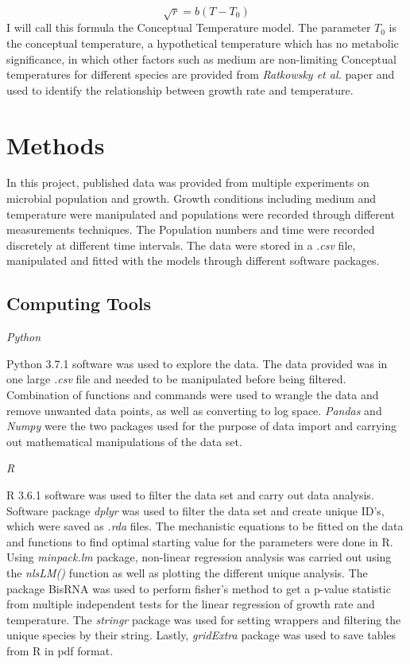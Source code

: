 \documentclass[11pt]{article}
\begin{document}
\begin{equation*}
    \sqrt{r}=b(T-T_0) \label{eq:Conceptual Temperature model} \tag{3}
\end{equation*}
I will call this formula the Conceptual Temperature model. The parameter $T_0$ is the conceptual temperature, a hypothetical temperature which has no metabolic significance, in which other factors such as medium are non-limiting \cite{ratkowsky1982relationship} Conceptual temperatures for different species are provided from \textit{Ratkowsky et al.} paper and used to identify the relationship between growth rate and temperature.

\section{Methods}
In this project, published data was provided from multiple experiments on microbial population and growth. Growth conditions including medium and temperature were manipulated and populations were recorded through different measurements techniques. The Population numbers and time were recorded discretely at different time intervals. The data were stored in a \textit{.csv} file, manipulated and fitted with the models through different software packages.\\

\subsection{Computing Tools}
\textit{Python}

Python 3.7.1 software was used to explore the data. The data provided was in one large \textit{.csv} file and needed to be manipulated before being filtered. Combination of functions and commands were used to wrangle the data and remove unwanted data points, as well as converting to log space. \textit{Pandas} and \textit{Numpy} were the two packages used for the purpose of data import and carrying out mathematical manipulations of the data set.

\textit{R}

R 3.6.1 software was used to filter the data set and carry out data analysis. Software package \textit{dplyr} was used to filter the data set and create unique ID’s, which were saved as \textit{.rda} files. The mechanistic equations to be fitted on the data and functions to find optimal starting value for the parameters were done in R. Using \textit{minpack.lm} package, non-linear regression analysis was carried out using the \textit{nlsLM()} function as well as plotting the different unique analysis. The package BisRNA was used to perform fisher's method to get a p-value statistic from multiple independent tests for the linear regression of growth rate and temperature. The \textit{stringr} package was used for setting wrappers and filtering the unique species by their string. Lastly, \textit{gridExtra} package was used to save tables from R in pdf format.
\end{document}

